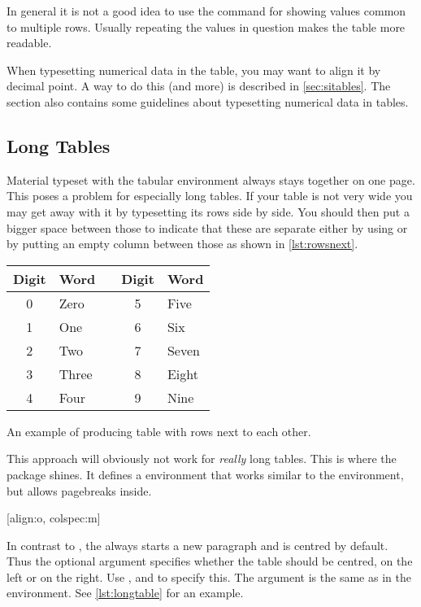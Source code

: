 In general it is not a good idea to use the  command for showing
values common to multiple rows. Usually repeating the values in question makes
the table more readable.

When typesetting numerical data in the table, you may want to align it by
decimal point. A way to do this (and more) is described in
\autoref{sec:sitables}. The section also contains some guidelines about
typesetting numerical data in tables.

\subsection{Long Tables}

Material typeset with the tabular environment always stays together on one
page. This poses a problem for especially long tables. If your table is not
very wide you may get away with it by typesetting its rows side by side. You
should then put a bigger space between those to indicate that these are
separate either by using  or by putting an empty column between
those as shown in \autoref{lst:rowsnext}.
\begin{listing}
  \begin{example}[vertical_mode, examplewidth=0.6\linewidth]
\begin{tabular}{@{}cllcl@{}}
  \toprule
  Digit & Word  && Digit & Word  \\
  \midrule
  0     & Zero  && 5     & Five  \\
  1     & One   && 6     & Six   \\
  2     & Two   && 7     & Seven \\
  3     & Three && 8     & Eight \\
  4     & Four  && 9     & Nine  \\
  \bottomrule
\end{tabular}
\end{example}
  \caption{An example of producing table with rows next to each other.}\label{lst:rowsnext}
\end{listing}

This approach will obviously not work for \emph{really} long tables. This is
where the  package shines. It defines a 
environment that works similar to the  environment, but allows
pagebreaks inside.

\begin{lscommand}
  [align:o, colspec:m]
\end{lscommand}
In contrast to , the  always starts a new paragraph
and is centred by default. Thus the optional argument  specifies
whether the table should be centred, on the left or on the right. Use
,  and  to specify this. The  argument
is the same as in the  environment. See \autoref{lst:longtable}
for an example.

